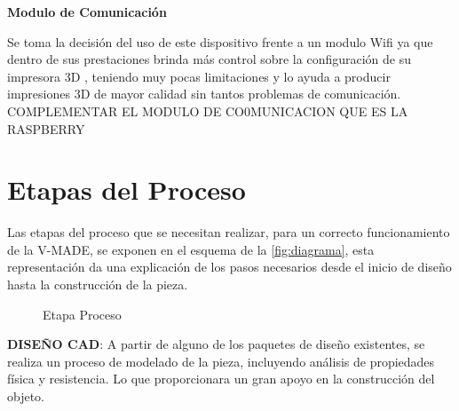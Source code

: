 \textbf{Modulo de Comunicación}

Se toma la decisión del uso de este dispositivo frente a un modulo Wifi ya que dentro de sus prestaciones brinda más control sobre la configuración de su impresora 3D , teniendo muy pocas limitaciones y lo ayuda a producir impresiones 3D de mayor calidad sin tantos problemas de comunicación.\\

COMPLEMENTAR EL MODULO DE CO0MUNICACION QUE ES LA RASPBERRY

\section{Etapas del Proceso}

Las etapas del proceso que se necesitan realizar, para un correcto funcionamiento de la V-MADE, se exponen en el esquema de la \autoref{fig:diagrama}, esta representación da una explicación de los pasos necesarios desde el inicio de diseño hasta la construcción de la pieza.

\begin{figure}[H]
    \centering
    \caption{Etapa Proceso}
    \label{fig:diagrama}
\end{figure}

\textbf{DISEÑO CAD}: A partir de alguno de los paquetes de diseño existentes, se realiza un proceso de modelado de la pieza, incluyendo análisis de propiedades física y resistencia. Lo que proporcionara un gran apoyo en la construcción del objeto.  \\

